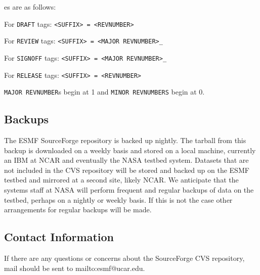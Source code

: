es are as follows:
\begin{description}
  \item For {\tt DRAFT} tags: {\tt <SUFFIX> = <REVNUMBER>}
  \item For {\tt REVIEW} tags: {\tt <SUFFIX> = <MAJOR REVNUMBER>\_<MINOR REVNUMBER>}
  \item For {\tt SIGNOFF} tags: {\tt <SUFFIX> = <MAJOR REVNUMBER>\_<MINOR REVNUMBER>}
  \item For {\tt RELEASE} tags: {\tt <SUFFIX> = <REVNUMBER>}

  {\tt MAJOR REVNUMBER}s begin at 1 and {\tt MINOR REVNUMBERS} begin at 0.
\end{description}

\subsection{Backups}

The ESMF SourceForge repository is backed up nightly.  The tarball
from this backup is downloaded on a weekly basis and stored on a local
machine, currently an IBM at NCAR and eventually the NASA testbed 
system.  Datasets that are not included in the CVS repository will be 
stored and backed up on the ESMF testbed and mirrored at a second site, 
likely NCAR.  We anticipate that the systems staff at NASA will perform
frequent and regular backups of data on the testbed, perhaps on a nightly 
or weekly basis.  If this is not the case other arrangements for regular
backups will be made. 

\subsection{Contact Information}

If there are any questions or concerns about the SourceForge CVS 
repository, mail should be sent to 
{mailto:esmf@ucar.edu}.







